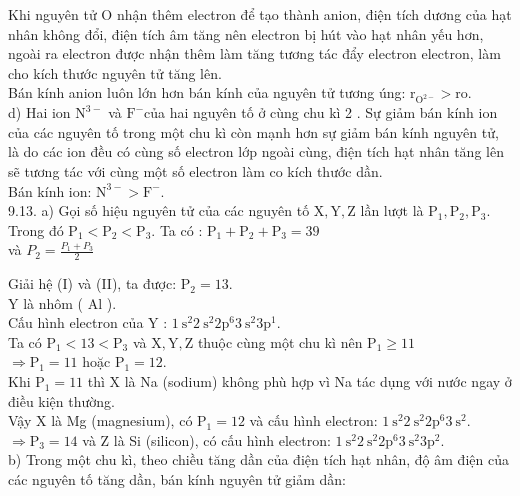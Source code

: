\documentclass[10pt]{article}
\begin{document}
Khi nguyên tử O nhận thêm electron để tạo thành anion, điện tích dương của hạt nhân không đổi, điện tích âm tăng nên electron bị hút vào hạt nhân yếu hơn, ngoài ra electron được nhận thêm làm tăng tương tác đẩy electron electron, làm cho kích thước nguyên tử tăng lên.\\
Bán kính anion luôn lớn hơn bán kính của nguyên tử tương úng: $\mathrm{r}_{\mathrm{O}^{2-}}>\mathrm{ro}$.\\
d) Hai ion $\mathrm{N}^{3-}$ và $\mathrm{F}^{-}$của hai nguyên tố ở cùng chu kì 2 . Sự giảm bán kính ion của các nguyên tố trong một chu kì còn mạnh hơn sự giảm bán kính nguyên tử, là do các ion đều có cùng số electron lớp ngoài cùng, điện tích hạt nhân tăng lên sẽ tương tác với cùng một số electron làm co kích thước dần.\\
Bán kính ion: $\mathrm{N}^{3-}>\mathrm{F}^{-}$.\\
9.13. a) Gọi số hiệu nguyên tử của các nguyên tố $\mathrm{X}, \mathrm{Y}, \mathrm{Z}$ lần lượt là $\mathrm{P}_{1}, \mathrm{P}_{2}, \mathrm{P}_{3}$. Trong đó $\mathrm{P}_{1}<\mathrm{P}_{2}<\mathrm{P}_{3}$. Ta có : $\mathrm{P}_{1}+\mathrm{P}_{2}+\mathrm{P}_{3}=39$\\
và $P_{2}=\frac{P_{1}+P_{3}}{2}$

Giải hệ (I) và (II), ta được: $\mathrm{P}_{2}=13$.\\
Y là nhôm ( Al ).\\
Cấu hình electron của Y : $1 \mathrm{~s}^{2} 2 \mathrm{~s}^{2} 2 \mathrm{p}^{6} 3 \mathrm{~s}^{2} 3 \mathrm{p}^{1}$.\\
Ta có $\mathrm{P}_{1}<13<\mathrm{P}_{3}$ và $\mathrm{X}, \mathrm{Y}, \mathrm{Z}$ thuộc cùng một chu kì nên $\mathrm{P}_{1} \geq 11$\\
$\Rightarrow \mathrm{P}_{1}=11$ hoặc $\mathrm{P}_{1}=12$.\\
Khi $\mathrm{P}_{1}=11$ thì X là Na (sodium) không phù hợp vì Na tác dụng với nước ngay ở điều kiện thường.\\
Vậy X là Mg (magnesium), có $\mathrm{P}_{1}=12$ và cấu hình electron: $1 \mathrm{~s}^{2} 2 \mathrm{~s}^{2} 2 \mathrm{p}^{6} 3 \mathrm{~s}^{2}$.\\
$\Rightarrow \mathrm{P}_{3}=14$ và Z là Si (silicon), có cấu hình electron: $1 \mathrm{~s}^{2} 2 \mathrm{~s}^{2} 2 \mathrm{p}^{6} 3 \mathrm{~s}^{2} 3 \mathrm{p}^{2}$.\\
b) Trong một chu kì, theo chiều tăng dần của điện tích hạt nhân, độ âm điện của các nguyên tố tăng dần, bán kính nguyên tử giảm dần:
\end{document}
